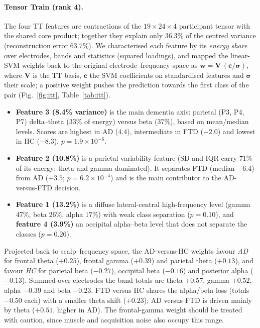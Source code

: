 \documentclass[10pt,twocolumn,a4paper]{article}
\begin{document}
\paragraph{Tensor Train (rank 4).}
The four TT features are contractions of the $19{\times}24{\times}4$ participant tensor with the shared core product; together they explain only $36.3\%$ of the centred variance (reconstruction error $63.7\%$). We characterised each feature by its \emph{energy share} over electrodes, bands and statistics (squared loadings), and mapped the linear-SVM weights back to the original electrode--frequency space as $\mathbf w=\mathbf V\,(\mathbf c/\boldsymbol\sigma)$, where $\mathbf V$ is the TT basis, $\mathbf c$ the SVM coefficients on standardised features and $\boldsymbol\sigma$ their scale; a positive weight pushes the prediction towards the first class of the pair (Fig.~\ref{fig:itt}, Table~\ref{tab:itt}).
\begin{itemize}
\item \textbf{Feature 3 (8.4\% variance)} is the main dementia axis: parietal (P3, P4, P7) delta--theta ($33\%$ of energy) versus beta ($37\%$), based on mean/median levels. Scores are highest in AD ($4.4$), intermediate in FTD ($-2.0$) and lowest in HC ($-8.3$), $p=1.9{\times}10^{-6}$.
\item \textbf{Feature 2 (10.8\%)} is a parietal variability feature (SD and IQR carry $71\%$ of its energy; theta and gamma dominated). It separates FTD (median $-6.4$) from AD ($+3.5$; $p=6.2{\times}10^{-4}$) and is the main contributor to the AD-versus-FTD decision.
\item \textbf{Feature 1 (13.2\%)} is a diffuse lateral-central high-frequency level (gamma $47\%$, beta $26\%$, alpha $17\%$) with weak class separation ($p=0.10$), and \textbf{feature 4 (3.9\%)} an occipital alpha--beta level that does not separate the classes ($p=0.26$).
\end{itemize}
Projected back to scalp--frequency space, the AD-versus-HC weights favour \emph{AD} for frontal theta ($+0.25$), frontal gamma ($+0.39$) and parietal theta ($+0.13$), and favour \emph{HC} for parietal beta ($-0.27$), occipital beta ($-0.16$) and posterior alpha ($-0.13$). Summed over electrodes the band totals are theta $+0.57$, gamma $+0.52$, alpha $-0.39$ and beta $-0.23$. FTD versus HC shares the alpha/beta loss (totals $-0.50$ each) with a smaller theta shift ($+0.23$); AD versus FTD is driven mainly by theta ($+0.51$, higher in AD). The frontal-gamma weight should be treated with caution, since muscle and acquisition noise also occupy this range.
\end{document}
